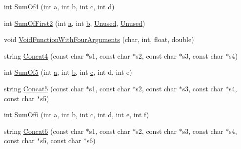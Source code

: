 \begin{DoxyCompactItemize}
\item 
int \hyperlink{namespacetesting_1_1gmock__more__actions__test_a41c348fff8608825239a276b8426a475}{Sum\+Of4} (int \hyperlink{_07copy_08_2_read_camera_model_8m_a551a3d351eadcc0b9b1a2f24f0fb5ea0}{a}, int \hyperlink{jquery_8js_a2fa551895933fae935a0a6b87282241d}{b}, int \hyperlink{jquery_8js_abce695e0af988ece0826d9ad59b8160d}{c}, int d)
\item 
int \hyperlink{namespacetesting_1_1gmock__more__actions__test_aaa60ddffb96ddc3a73b0b22929ca5bec}{Sum\+Of\+First2} (int \hyperlink{_07copy_08_2_read_camera_model_8m_a551a3d351eadcc0b9b1a2f24f0fb5ea0}{a}, int \hyperlink{jquery_8js_a2fa551895933fae935a0a6b87282241d}{b}, \hyperlink{namespacetesting_a603e329ec0263ebfcf16f712810bd511}{Unused}, \hyperlink{namespacetesting_a603e329ec0263ebfcf16f712810bd511}{Unused})
\item 
void \hyperlink{namespacetesting_1_1gmock__more__actions__test_a8c952be61635486e84c1eca3bf3acd9b}{Void\+Function\+With\+Four\+Arguments} (char, int, float, double)
\item 
string \hyperlink{namespacetesting_1_1gmock__more__actions__test_aa423cedcbd858249b616f0c537a1e4cf}{Concat4} (const char $\ast$s1, const char $\ast$s2, const char $\ast$s3, const char $\ast$s4)
\item 
int \hyperlink{namespacetesting_1_1gmock__more__actions__test_a38e64569bf08e83c6db22c1fb0fe0af6}{Sum\+Of5} (int \hyperlink{_07copy_08_2_read_camera_model_8m_a551a3d351eadcc0b9b1a2f24f0fb5ea0}{a}, int \hyperlink{jquery_8js_a2fa551895933fae935a0a6b87282241d}{b}, int \hyperlink{jquery_8js_abce695e0af988ece0826d9ad59b8160d}{c}, int d, int e)
\item 
string \hyperlink{namespacetesting_1_1gmock__more__actions__test_a2ac9917d1aa19cd7ac32bba837f4eacc}{Concat5} (const char $\ast$s1, const char $\ast$s2, const char $\ast$s3, const char $\ast$s4, const char $\ast$s5)
\item 
int \hyperlink{namespacetesting_1_1gmock__more__actions__test_a139632d344348fdfa25111d4e43f70ba}{Sum\+Of6} (int \hyperlink{_07copy_08_2_read_camera_model_8m_a551a3d351eadcc0b9b1a2f24f0fb5ea0}{a}, int \hyperlink{jquery_8js_a2fa551895933fae935a0a6b87282241d}{b}, int \hyperlink{jquery_8js_abce695e0af988ece0826d9ad59b8160d}{c}, int d, int e, int f)
\item 
string \hyperlink{namespacetesting_1_1gmock__more__actions__test_a4de188277a85d007de0aa6e8dc364b75}{Concat6} (const char $\ast$s1, const char $\ast$s2, const char $\ast$s3, const char $\ast$s4, const char $\ast$s5, const char $\ast$s6)

\end{DoxyCompactItemize}
